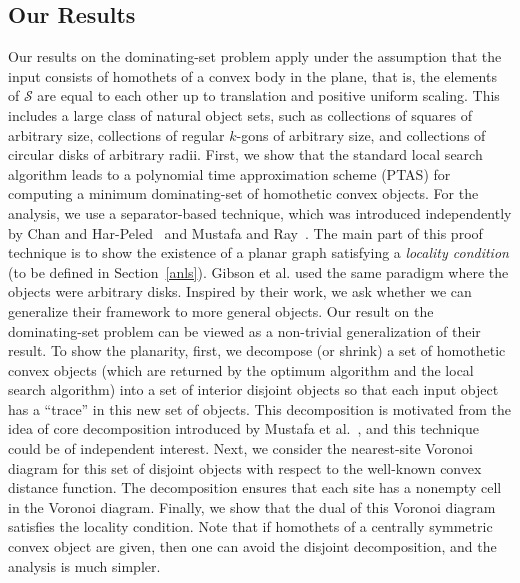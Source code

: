 \documentclass[a4paper,11pt]{article}
\begin{document}
\subsection{Our Results} 
{Our results on the dominating-set problem apply under the assumption that the input consists of homothets of a convex body in the plane, that is, the elements of $\mathscr{S}$ are equal to each other up to translation and positive uniform scaling. This includes a large class of natural object sets, such as collections of squares of arbitrary size, collections of regular $k$-gons of arbitrary size, and collections of circular disks of arbitrary radii.}
First, we show that   the standard local search 
algorithm leads to  a  polynomial time approximation scheme (PTAS)  for 
 computing  a minimum  dominating-set 
 of homothetic convex objects. 
For the analysis, we  
use {a} separator-based  technique, which was introduced independently by Chan {and}
Har-Peled~\cite{ChanH09} and  Mustafa  {and} Ray~\cite{MustafaR10}. The main 
part of this proof technique  is to show the existence of a planar graph 
satisfying a \emph{locality 
condition} {(to be defined in Section~\ref{anls})}. Gibson et al. \cite{GibsonP10} used the same paradigm where the 
objects were arbitrary disks. Inspired by their work, we ask whether we can generalize their framework to more general objects.
Our result on {the dominating-set problem} can be viewed as a non-trivial generalization of 
their result. 
To show the planarity, first, we decompose (or shrink) a set of homothetic 
convex 
objects (which are returned by the optimum algorithm and the local search 
algorithm) into a set of interior disjoint  objects so that each input 
object has a ``trace'' in this new set of objects. This
decomposition is motivated from the idea 
of core decomposition  introduced by Mustafa et al.~\cite{Ray}, and 
this technique could be of independent interest. 
Next, we   consider the nearest-site Voronoi diagram for this set of  
disjoint  objects with respect to the well-known convex distance 
function. The decomposition  ensures that each site has a nonempty cell in the  Voronoi diagram. Finally, we 
show that the dual of this Voronoi diagram satisfies the  {locality 
condition}.  Note that if  homothets of a centrally symmetric convex object are given, then one can avoid the disjoint decomposition, and the analysis is much simpler. 
\end{document}
